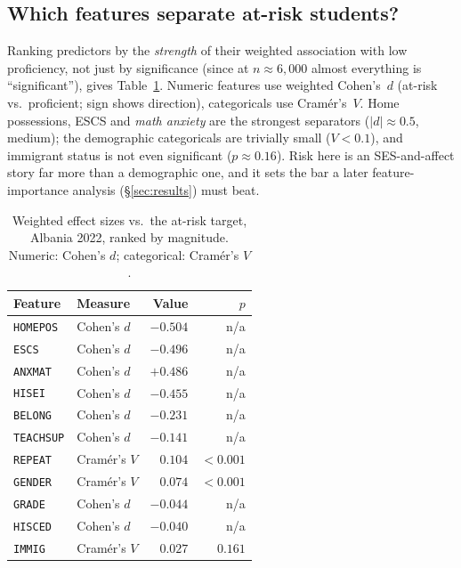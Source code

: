\subsection{Which features separate at-risk students?}
Ranking predictors by the \emph{strength} of their weighted association with low
proficiency, not just by significance (since at $n\approx6{,}000$ almost everything is
``significant''), gives Table~\ref{tab:effectsize}. Numeric features use weighted
Cohen's~$d$ (at-risk vs.\ proficient; sign shows direction), categoricals use
Cram\'er's~$V$. Home possessions, ESCS and \emph{math anxiety} are the strongest
separators ($|d|\approx0.5$, medium); the demographic categoricals are trivially small
($V<0.1$), and immigrant status is not even significant ($p\approx0.16$). Risk here is
an SES-and-affect story far more than a demographic one, and it sets the bar a later
feature-importance analysis (\S\ref{sec:results}) must beat.

\begin{table}[t]
\centering
\caption[Weighted effect sizes versus the at-risk target, Albania 2022]{Weighted effect sizes vs.\ the at-risk target, Albania 2022, ranked by
magnitude. Numeric: Cohen's $d$; categorical: Cram\'er's $V$.}
\label{tab:effectsize}
\small
\begin{tabular}{@{}l l r r@{}}
\toprule
Feature & Measure & Value & $p$ \\
\midrule
\texttt{HOMEPOS}  & Cohen's $d$   & $-0.504$ & n/a \\
\texttt{ESCS}     & Cohen's $d$   & $-0.496$ & n/a \\
\texttt{ANXMAT}   & Cohen's $d$   & $+0.486$ & n/a \\
\texttt{HISEI}    & Cohen's $d$   & $-0.455$ & n/a \\
\texttt{BELONG}   & Cohen's $d$   & $-0.231$ & n/a \\
\texttt{TEACHSUP} & Cohen's $d$   & $-0.141$ & n/a \\
\texttt{REPEAT}   & Cram\'er's $V$ & $0.104$ & $<0.001$ \\
\texttt{GENDER}   & Cram\'er's $V$ & $0.074$ & $<0.001$ \\
\texttt{GRADE}    & Cohen's $d$   & $-0.044$ & n/a \\
\texttt{HISCED}   & Cohen's $d$   & $-0.040$ & n/a \\
\texttt{IMMIG}    & Cram\'er's $V$ & $0.027$ & $0.161$ \\
\bottomrule
\end{tabular}
\end{table}

